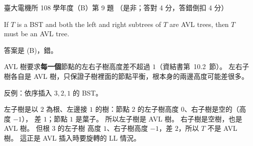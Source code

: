 \begin{pastexam}[label={px:ntu-108-ee-dsb-09}]{臺大電機所 108 學年度（B）第 9 題}
（是非；答對 4 分，答錯倒扣 4 分）

If $T$ is a BST and both the left and right subtrees of $T$ are AVL trees, then $T$ must be an
AVL tree.
\end{pastexam}

\begin{pastsoln}
答案是 (B)，錯。

AVL 樹要求\textbf{每一個}節點的左右子樹高度差不超過 $1$（資結書第~10.2~節）。 左右子樹各自是
AVL 樹，只保證子樹裡面的節點平衡，根本身的兩邊高度可能差很多。

反例：依序插入 $3, 2, 1$ 的 BST。
\begin{center}
\end{center}
左子樹是以 $2$ 為根、左邊接 $1$ 的樹：節點 $2$ 的左子樹高度 $0$、右子樹是空的（高度 $-1$），
差 $1$；節點 $1$ 是葉子。 所以左子樹是 AVL 樹。 右子樹是空樹，也是 AVL 樹。 但根 $3$ 的左子樹
高度 $1$、右子樹高度 $-1$，差 $2$，所以 $T$ 不是 AVL 樹。 這正是 AVL 插入時要旋轉的 LL 情況。
\end{pastsoln}
